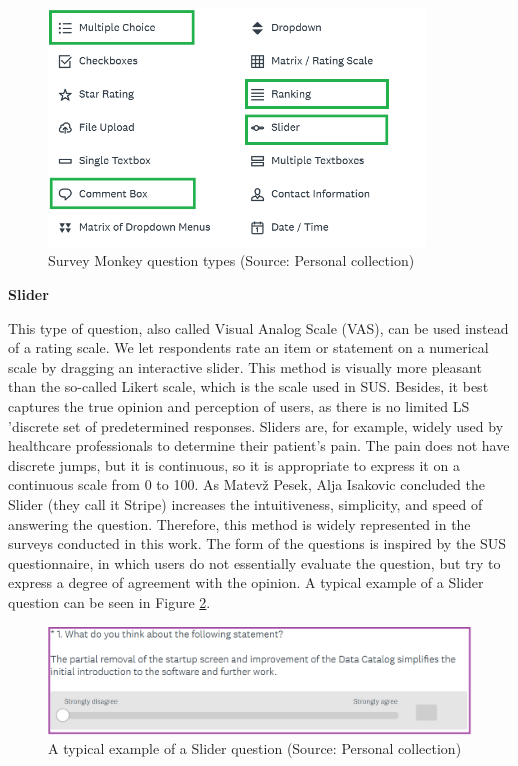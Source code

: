 \documentclass[a4paper,10pt,twoside]{article}
\begin{document}
\vspace{0.3cm}
\begin{figure}[hbt!] 
\begin{center}
\includegraphics[width=10cm]{../pictures/survey_monkey_options.png} 
\caption[Survey Monkey answer types ]{Survey Monkey question types (Source: Personal collection)}
\label{fig:survey_monkey_options}
\end{center}
\end{figure}


\noindent \textbf {Slider}
\label{sec:slider}

\noindent This type of question, also called Visual Analog Scale
(VAS), can be used instead of a rating scale. We let respondents rate
an item or statement on a numerical scale by dragging an interactive
slider. This method is visually more pleasant than the so-called
Likert scale, which is the scale used in SUS. Besides, it best
captures the true opinion and perception of users, as there is no
limited LS 'discrete set of predetermined responses. Sliders are, for
example, widely used by healthcare professionals to determine their
patient's pain. The pain does not have discrete jumps, but it is
continuous, so it is appropriate to express it on a continuous scale
from 0 to 100. As Matevž Pesek, Alja Isakovic \cite{inproceedings}
concluded the Slider (they call it Stripe) increases the
intuitiveness, simplicity, and speed of answering the
question. Therefore, this method is widely represented in the surveys
conducted in this work. The form of the questions is inspired by the
SUS questionnaire, in which users do not essentially evaluate the
question, but try to express a degree of agreement with the opinion. A
typical example of a Slider question can be seen in Figure
\ref{fig:slider_question}.

\vspace{0.3cm}
\begin{figure}[hbt!] 
\begin{center}
\includegraphics[width=16cm]{../pictures/slider_question.png} 
\caption[A typical example of a Slider question]{A typical example of a Slider question (Source: Personal collection)}
\label{fig:slider_question}
\end{center}
\end{figure}
\end{document}
